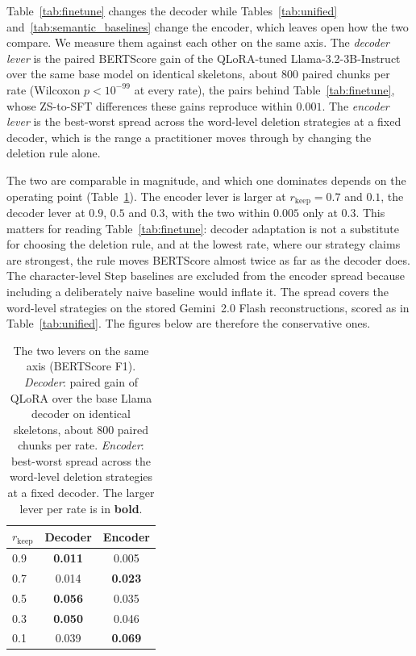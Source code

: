 \documentclass[11pt]{article}
\newcommand{\rkeep}{r_{\mathrm{keep}}}
\begin{document}
Table~\ref{tab:finetune} changes the decoder while Tables~\ref{tab:unified}
and~\ref{tab:semantic_baselines} change the encoder, which leaves open how the two compare. We measure them
against each other on the same axis. The \emph{decoder lever} is the paired BERTScore gain of the
QLoRA-tuned Llama-3.2-3B-Instruct over the same base model on identical skeletons, about $800$
paired chunks per rate (Wilcoxon $p < 10^{-99}$ at every rate), the pairs behind Table~\ref{tab:finetune},
whose ZS-to-SFT differences these gains reproduce within $0.001$. The \emph{encoder lever} is the best-worst
spread across the word-level deletion strategies at a fixed decoder, which is the range a practitioner
moves through by changing the deletion rule alone.

The two are comparable in magnitude, and which one dominates depends on the operating point
(Table~\ref{tab:levers}). The encoder lever is larger at $\rkeep = 0.7$ and $0.1$, the decoder lever
at $0.9$, $0.5$ and $0.3$, with the two within $0.005$ only at $0.3$. This matters for reading
Table~\ref{tab:finetune}: decoder adaptation is not a substitute for choosing the deletion rule, and at
the lowest rate, where our strategy claims are strongest, the rule moves BERTScore almost twice as far as
the decoder does. The character-level Step baselines are excluded from the encoder spread because including a deliberately naive baseline would inflate it. The spread covers the word-level strategies on the stored Gemini~2.0 Flash reconstructions, scored as in Table~\ref{tab:unified}. The figures below are therefore the conservative ones.

\begin{table}[htbp]
\centering
\small
\setlength{\tabcolsep}{4pt}
\caption{The two levers on the same axis (BERTScore F1). \emph{Decoder}: paired gain of QLoRA over the base
Llama decoder on identical skeletons, about $800$ paired chunks per rate. \emph{Encoder}: best-worst spread
across the word-level deletion strategies at a fixed decoder. The larger lever per rate is in
\textbf{bold}.}
\label{tab:levers}
\begin{tabular}{lcc}
\toprule
$\rkeep$ & Decoder & Encoder \\
\midrule
0.9 & \textbf{0.011} & 0.005 \\
0.7 & 0.014 & \textbf{0.023} \\
0.5 & \textbf{0.056} & 0.035 \\
0.3 & \textbf{0.050} & 0.046 \\
0.1 & 0.039 & \textbf{0.069} \\
\bottomrule
\end{tabular}
\end{table}
\end{document}
